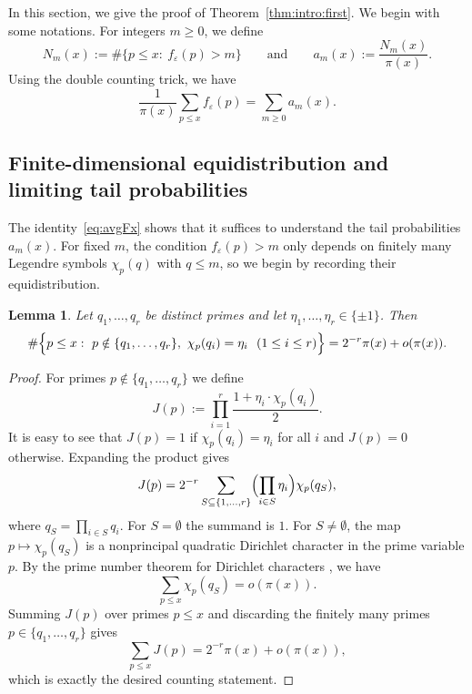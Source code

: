 \documentclass[11pt,letterpaper,reqno]{amsart}
\newtheorem{lemma}[theorem]{Lemma}
\theoremstyle{definition}
\numberwithin{equation}{section}
\newcommand{\eps}{\varepsilon}
\newcommand{\1}{\mathbf{1}}
\begin{document}
In this section, we give the proof of Theorem~\ref{thm:intro:first}. We begin with some notations. For integers $m\ge 0$, we define
\[
N_m(x):=\#\{p\le x:\ f_{\varepsilon}(p)>m\}
\qquad \text{and} \qquad
a_m(x):=\frac{N_m(x)}{\pi(x)}.
\]
Using the double counting trick, we have
\begin{equation}\label{eq:avgFx}
\frac{1}{\pi(x)}\sum_{p\le x} f_\eps(p)=\sum_{m\ge 0} a_m(x).
\end{equation}



\subsection{Finite-dimensional equidistribution and limiting tail probabilities}
The identity~\eqref{eq:avgFx} shows that it suffices to understand the tail probabilities $a_m(x)$.
For fixed $m$, the condition $f_\varepsilon(p)>m$ only depends on finitely many Legendre symbols
$\chi_p(q)$ with $q\le m$, so we begin by recording their equidistribution.


\begin{lemma}\label{lem:equidistribution}
Let $q_1,\dots,q_r$ be distinct primes and let $\eta_1,\dots,\eta_r\in\{\pm 1\}$. Then
\[
\#\Bigl\{p\le x:\ p\notin\{q_1,\dots,q_r\},\ \chi_p(q_i)=\eta_i\ \ (1\le i\le r)\Bigr\}
=2^{-r}\pi(x)+o(\pi(x)).
\]
\end{lemma}

\begin{proof}
For primes $p\notin\{q_1,\dots,q_r\}$ we define
\[
J(p):=\prod_{i=1}^r\frac{1+\eta_i \cdot \chi_p(q_i)}{2}.
\]
It is easy to see that $J(p)=1$ if $\chi_p(q_i)=\eta_i$ for all $i$ and $J(p)=0$ otherwise.
Expanding the product gives
\[
J(p)=2^{-r}\sum_{S\subseteq\{1,\dots,r\}}\Bigl(\prod_{i\in S}\eta_i\Bigr)\chi_p(q_S),
\]
where $q_S=\prod_{i\in S}q_i$. For $S=\emptyset$ the summand is $1$. For $S\neq\emptyset$, the map
$p\mapsto \chi_p(q_S)$ is a nonprincipal quadratic Dirichlet character in the
prime variable $p$. By the prime number
theorem for Dirichlet characters \cite[Corollary~5.29]{IK}, we have
\[
\sum_{p\le x}\chi_p(q_S)=o(\pi(x)).
\]
Summing $J(p)$ over primes $p\le x$ and discarding the finitely many primes $p\in\{q_1,\dots,q_r\}$ gives
\[
\sum_{p\le x} J(p)=2^{-r}\pi(x)+o(\pi(x)),
\]
which is exactly the desired counting statement.
\end{proof}
\end{document}
